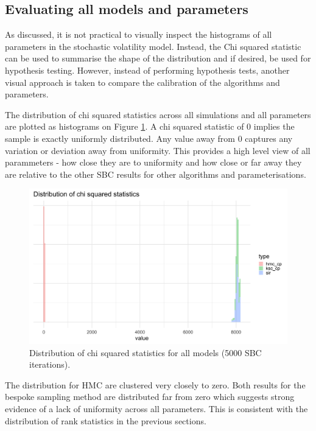 \documentclass[12pt, a4paper]{article}
\begin{document}
    \subsection{Evaluating all models and parameters}
    As discussed, it is not practical to visually inspect the histograms of all parameters in the stochastic volatility model. Instead, the Chi squared statistic can be used to summarise the shape of the distribution and if desired, be used for hypothesis testing. However, instead of performing hypothesis tests, another visual approach is taken to compare the calibration of the algorithms and parameters. 

    The distribution of chi squared statistics across all simulations and all parameters are plotted as histograms on Figure \ref{fig:allchisq}. A chi squared statistic of 0 implies the sample is exactly uniformly distributed. Any value away from 0 captures any variation or deviation away from uniformity. This provides a high level view of all parammeters - how close they are to uniformity and how close or far away they are relative to the other SBC results for other algorithms and parameterisations. 

    \begin{figure}[H]
        \centering
        \includegraphics[scale=0.1]{results/dist_chisq.png}
        \caption{Distribution of chi squared statistics for all models (5000 SBC iterations).}
        \label{fig:allchisq}
    \end{figure}

    The distribution for HMC are clustered very closely to zero. Both results for the bespoke sampling method are distributed far from zero which suggests strong evidence of a lack of uniformity across all parameters. This is consistent with the distribution of rank statistics in the previous sections. 
\end{document}
